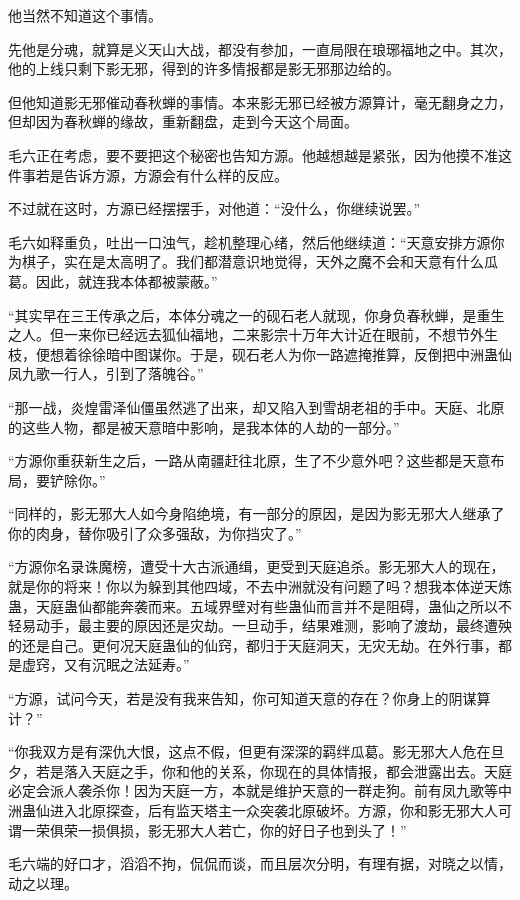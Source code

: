 \begin{this_body}
他当然不知道这个事情。

先他是分魂，就算是义天山大战，都没有参加，一直局限在琅琊福地之中。其次，他的上线只剩下影无邪，得到的许多情报都是影无邪那边给的。

但他知道影无邪催动春秋蝉的事情。本来影无邪已经被方源算计，毫无翻身之力，但却因为春秋蝉的缘故，重新翻盘，走到今天这个局面。

毛六正在考虑，要不要把这个秘密也告知方源。他越想越是紧张，因为他摸不准这件事若是告诉方源，方源会有什么样的反应。

不过就在这时，方源已经摆摆手，对他道：“没什么，你继续说罢。”

毛六如释重负，吐出一口浊气，趁机整理心绪，然后他继续道：“天意安排方源你为棋子，实在是太高明了。我们都潜意识地觉得，天外之魔不会和天意有什么瓜葛。因此，就连我本体都被蒙蔽。”

“其实早在三王传承之后，本体分魂之一的砚石老人就现，你身负春秋蝉，是重生之人。但一来你已经远去狐仙福地，二来影宗十万年大计近在眼前，不想节外生枝，便想着徐徐暗中图谋你。于是，砚石老人为你一路遮掩推算，反倒把中洲蛊仙凤九歌一行人，引到了落魄谷。”

“那一战，炎煌雷泽仙僵虽然逃了出来，却又陷入到雪胡老祖的手中。天庭、北原的这些人物，都是被天意暗中影响，是我本体的人劫的一部分。”

“方源你重获新生之后，一路从南疆赶往北原，生了不少意外吧？这些都是天意布局，要铲除你。”

“同样的，影无邪大人如今身陷绝境，有一部分的原因，是因为影无邪大人继承了你的肉身，替你吸引了众多强敌，为你挡灾了。”

“方源你名录诛魔榜，遭受十大古派通缉，更受到天庭追杀。影无邪大人的现在，就是你的将来！你以为躲到其他四域，不去中洲就没有问题了吗？想我本体逆天炼蛊，天庭蛊仙都能奔袭而来。五域界壁对有些蛊仙而言并不是阻碍，蛊仙之所以不轻易动手，最主要的原因还是灾劫。一旦动手，结果难测，影响了渡劫，最终遭殃的还是自己。更何况天庭蛊仙的仙窍，都归于天庭洞天，无灾无劫。在外行事，都是虚窍，又有沉眠之法延寿。”

“方源，试问今天，若是没有我来告知，你可知道天意的存在？你身上的阴谋算计？”

“你我双方是有深仇大恨，这点不假，但更有深深的羁绊瓜葛。影无邪大人危在旦夕，若是落入天庭之手，你和他的关系，你现在的具体情报，都会泄露出去。天庭必定会派人袭杀你！因为天庭一方，本就是维护天意的一群走狗。前有凤九歌等中洲蛊仙进入北原探查，后有监天塔主一众突袭北原破坏。方源，你和影无邪大人可谓一荣俱荣一损俱损，影无邪大人若亡，你的好日子也到头了！”

毛六端的好口才，滔滔不拘，侃侃而谈，而且层次分明，有理有据，对晓之以情，动之以理。


\end{this_body}

